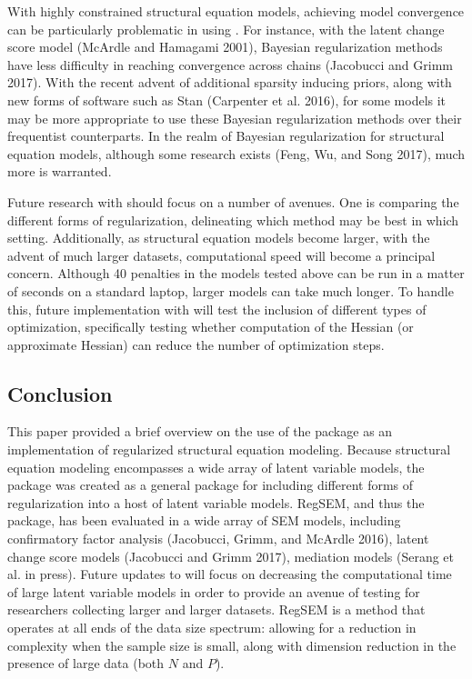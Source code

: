 \documentclass[article]{jss}
\begin{document}
With highly constrained structural equation models, achieving model
convergence can be particularly problematic in using . For
instance, with the latent change score model (McArdle and Hamagami
2001), Bayesian regularization methods have less difficulty in reaching
convergence across chains (Jacobucci and Grimm 2017). With the recent
advent of additional sparsity inducing priors, along with new forms of
software such as Stan (Carpenter et al. 2016), for some models it may be
more appropriate to use these Bayesian regularization methods over their
frequentist counterparts. In the realm of Bayesian regularization for
structural equation models, although some research exists (Feng, Wu, and
Song 2017), much more is warranted.

Future research with  should focus on a number of avenues.
One is comparing the different forms of regularization, delineating
which method may be best in which setting. Additionally, as structural
equation models become larger, with the advent of much larger datasets,
computational speed will become a principal concern. Although 40
penalties in the models tested above can be run in a matter of seconds
on a standard laptop, larger models can take much longer. To handle
this, future implementation with  will test the inclusion of
different types of optimization, specifically testing whether
computation of the Hessian (or approximate Hessian) can reduce the
number of optimization steps.

\subsection{Conclusion}\label{conclusion}

This paper provided a brief overview on the use of the 
package as an implementation of regularized structural equation
modeling. Because structural equation modeling encompasses a wide array
of latent variable models, the  package was created as a
general package for including different forms of regularization into a
host of latent variable models. RegSEM, and thus the 
package, has been evaluated in a wide array of SEM models, including
confirmatory factor analysis (Jacobucci, Grimm, and McArdle 2016),
latent change score models (Jacobucci and Grimm 2017), mediation models
(Serang et al. in press). Future updates to  will focus on
decreasing the computational time of large latent variable models in
order to provide an avenue of testing for researchers collecting larger
and larger datasets. RegSEM is a method that operates at all ends of the
data size spectrum: allowing for a reduction in complexity when the
sample size is small, along with dimension reduction in the presence of
large data (both \(N\) and \(P\)).
\end{document}
